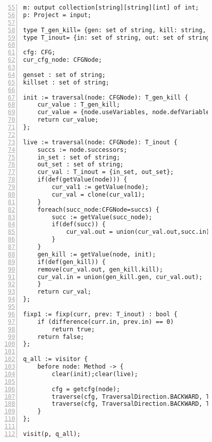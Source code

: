 \begin{figure}[ht!]
\begin{lstlisting}[numbers=left, tabsize=4, escapechar=@, caption={Live variable analysis},label={lst:live-variable},firstline=55, firstnumber=55] 
m: output collection[string][string][int] of int;
p: Project = input;

type T_gen_kill= {gen: set of string, kill: string, dummy : int};
type T_inout= {in: set of string, out: set of string};

cfg: CFG;
cur_cfg_node: CFGNode;

genset : set of string;
killset : set of string;

init := traversal(node: CFGNode): T_gen_kill {
	cur_value : T_gen_kill;
	cur_value = {node.useVariables, node.defVariables, 0};
	return cur_value;
};

live := traversal(node: CFGNode): T_inout {
	succs := node.successors;
	in_set : set of string;
	out_set : set of string;
	cur_val : T_inout = {in_set, out_set};
	if(def(getValue(node))) {
		cur_val1 := getValue(node);
		cur_val = clone(cur_val1);
	}
	foreach(succ_node:CFGNode=succs) {
		succ := getValue(succ_node);
		if(def(succ)) {
			cur_val.out = union(cur_val.out,succ.in);
		}
	}
	gen_kill := getValue(node, init);
	if(def(gen_kill)) {
	remove(cur_val.out, gen_kill.kill);
	cur_val.in = union(gen_kill.gen, cur_val.out);
	}
	return cur_val;
};

fixp1 := fixp(curr, prev: T_inout) : bool {
	if (difference(curr.in, prev.in) == 0)
		return true;	
	return false;
};

q_all := visitor {
	before node: Method -> {
		clear(init);clear(live);

		cfg = getcfg(node);
		traverse(cfg, TraversalDirection.BACKWARD, TraversalKind.HYBRID, init);
		traverse(cfg, TraversalDirection.BACKWARD, TraversalKind.HYBRID, live, fixp1);
	}
};

visit(p, q_all);
\end{lstlisting}
\end{figure}